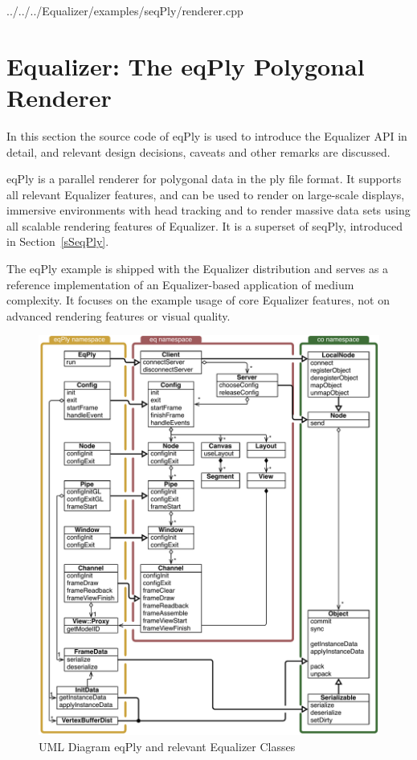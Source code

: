 \documentclass[10pt,a4]{scrartcl}
\newcommand{\sref}[1]{Section~\ref{#1}}
\begin{document}
{\footnotesize
  {../../../Equalizer/examples/seqPly/renderer.cpp}}


\section{\label{sEqPly}Equalizer: The eqPly Polygonal Renderer}

In this section the source code of \textsf{eqPly} is used to introduce the
Equalizer API in detail, and relevant design decisions, caveats and other
remarks are discussed.

\textsf{eqPly} is a parallel renderer for polygonal data in the
\textsf{ply} file format. It supports all relevant Equalizer features,
and can be used to render on large-scale displays, immersive
environments with head tracking and to render massive data sets using
all scalable rendering features of Equalizer. It is a superset of
\textsf{seqPly}, introduced in \sref{sSeqPly}.

The \textsf{eqPly} example is shipped with the Equalizer distribution
and serves as a reference implementation of an Equalizer-based
application of medium complexity. It focuses on the example usage of
core Equalizer features, not on advanced rendering features or visual
quality.

\begin{figure}[ht!]\center
  \includegraphics[width=.9\textwidth]{images/uml}
  {\caption{\label{fUml}UML Diagram eqPly and relevant Equalizer Classes}}
\end{figure}
\end{document}
